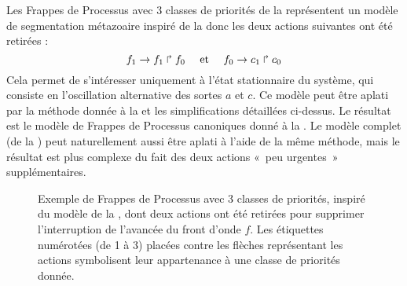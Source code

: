 \begin{example}
  Les Frappes de Processus avec 3 classes de priorités de la 
  représentent un modèle de segmentation métazoaire inspiré de la 
  donc les deux actions suivantes ont été retirées :
    \[f_1\rightarrow f_1\Rsh f_0 \quad \text{ et } \quad f_0\rightarrow c_1\Rsh c_0\]
  Cela permet de s'intéresser uniquement à l'état stationnaire du système,
  qui consiste en l'oscillation alternative des sortes $a$ et $c$.
  Ce modèle peut être aplati par la méthode donnée à la 
  et les simplifications détaillées ci-dessus.
  Le résultat est le modèle de Frappes de Processus canoniques donné à la
  .
  Le modèle complet (de la ) peut naturellement aussi être
  aplati à l'aide de la même méthode, mais le résultat est plus complexe du fait des
  deux actions «~peu urgentes~» supplémentaires.
  
  \begin{figure}[ht]
  \begin{center}
  \end{center}
  \caption{%
    Exemple de Frappes de Processus avec 3 classes de priorités,
    inspiré du modèle de la ,
    dont deux actions ont été retirées pour supprimer
    l'interruption de l'avancée du front d'onde $f$.
    Les étiquettes numérotées (de 1 à 3) placées contre les flèches représentant les actions
    symbolisent leur appartenance à une classe de priorités donnée.
  }
  \end{figure}


\end{example}
